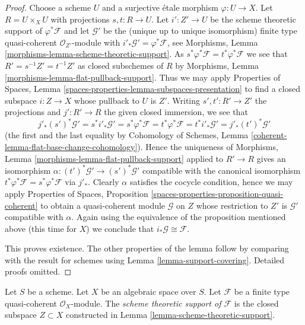 \begin{proof}
Choose a scheme $U$ and a surjective \'etale morphism $\varphi : U \to X$.
Let $R = U \times_X U$ with projections $s, t : R \to U$.
Let $i' : Z' \to U$ be the scheme theoretic support of $\varphi^*\mathcal{F}$
and let $\mathcal{G}'$ be the (unique up to unique isomorphism)
finite type quasi-coherent $\mathcal{O}_{Z'}$-module
with $i'_*\mathcal{G}' = \varphi^*\mathcal{F}$, see
Morphisms, Lemma \ref{morphisms-lemma-scheme-theoretic-support}.
As $s^*\varphi^*\mathcal{F} = t^*\varphi^*\mathcal{F}$ we see that
$R' = s^{-1}Z' = t^{-1}Z'$ as closed subschemes of $R$ by
Morphisms, Lemma \ref{morphisms-lemma-flat-pullback-support}.
Thus we may apply Properties of Spaces, Lemma
\ref{spaces-properties-lemma-subspaces-presentation}
to find a closed subspace $i : Z \to X$ whose pullback to $U$ is $Z'$.
Writing $s', t' : R' \to Z'$ the projections and
$j' : R' \to R$ the given closed immersion, we see that
$$
j'_* (s')^*\mathcal{G}' = s^* i'_*\mathcal{G}' =
s^*\varphi^*\mathcal{F} = t^*\varphi^*\mathcal{F} =
t^*i'_*\mathcal{G}' = j'_*(t')^*\mathcal{G}'
$$
(the first and the last equality by Cohomology of Schemes,
Lemma \ref{coherent-lemma-flat-base-change-cohomology}).
Hence the uniqueness of
Morphisms, Lemma \ref{morphisms-lemma-flat-pullback-support}
applied to $R' \to R$ gives an isomorphism
$\alpha : (t')^*\mathcal{G}' \to (s')^*\mathcal{G}'$
compatible with the canonical isomorphism
$t^*\varphi^*\mathcal{F} = s^*\varphi^*\mathcal{F}$
via $j'_*$. Clearly $\alpha$ satisfies the cocycle condition, hence
we may apply
Properties of Spaces, Proposition
\ref{spaces-properties-proposition-quasi-coherent}
to obtain a quasi-coherent module $\mathcal{G}$ on $Z$ whose restriction
to $Z'$ is $\mathcal{G}'$ compatible with $\alpha$.
Again using the equivalence of the proposition mentioned above
(this time for $X$) we conclude that $i_*\mathcal{G} \cong \mathcal{F}$.

\medskip\noindent
This proves existence. The other properties of the lemma follow
by comparing with the result for schemes using
Lemma \ref{lemma-support-covering}.
Detailed proofs omitted.
\end{proof}

\begin{definition}
\label{definition-scheme-theoretic-support}
Let $S$ be a scheme. Let $X$ be an algebraic space over $S$.
Let $\mathcal{F}$ be a finite type quasi-coherent $\mathcal{O}_X$-module.
The {\it scheme theoretic support of $\mathcal{F}$} is the closed subspace
$Z \subset X$ constructed in Lemma \ref{lemma-scheme-theoretic-support}.
\end{definition}

